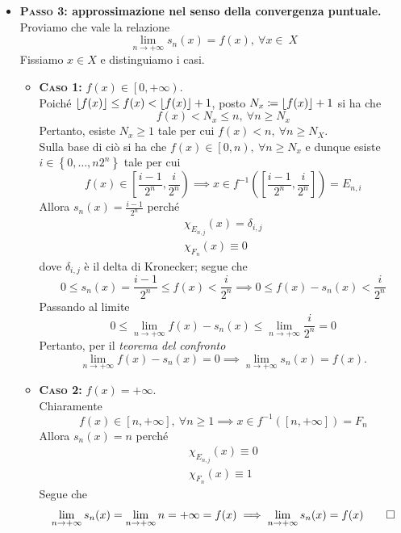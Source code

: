 \begin{demonstration}
\begin{itemize}
\item  \textbf{\textsc{Passo 3}: approssimazione nel senso della convergenza puntuale.}\\
	Proviamo che vale la relazione
	\begin{equation*}
		\lim_{n\to+\infty}s_n(x)=f(x),\ \forall x\in\ X
	\end{equation*}
Fissiamo $x\in X$ e distinguiamo i casi.
\begin{itemize}
	\item \textbf{\textsc{Caso 1:}} $f(x)\in\left[0,+\infty\right)$.\\
	Poiché $\lfloor f(x)\rfloor\leq f(x)<\lfloor f(x)\rfloor+1$, posto $N_x\coloneqq \lfloor f(x)\rfloor+1$ si ha che
	\begin{equation*}
		f(x)< N_x\leq n,\ \forall n\geq N_x
	\end{equation*}
Pertanto, esiste $N_x\geq 1$ tale per cui $f(x)<n,\ \forall n\geq N_X$.\\
Sulla base di ciò si ha che $f(x)\in\left[0,n\right),\ \forall n\geq N_x$ e dunque esiste $i\in\left\{0,\ldots,n2^n\right\}$ tale per cui
\begin{equation*}
	f(x)\in\left[\frac{i-1}{2^n},\frac{i}{2^n}\right)\implies x\in f^{-1}\left(\left[\frac{i-1}{2^n},\frac{i}{2^n}\right]\right)=E_{n,i}
\end{equation*}
Allora $s_n(x)=\frac{i-1}{2^n}$ perché
\begin{gather*}
	\chi_{E_{n,j}}(x)=\delta_{i,j}\\
	\chi_{F_n}(x)\equiv 0
\end{gather*}
dove $\delta_{i,j}$ è il delta di Kronecker; segue che
\begin{equation*}
	0\leq s_n(x)=\frac{i-1}{2^n}\leq f(x)< \frac{i}{2^n}\implies 0\leq f(x)-s_n(x)<\frac{i}{2^n}
\end{equation*}
Passando al limite
\begin{equation*}
	0\leq \lim_{n\to+\infty}f(x)-s_n(x)\leq \lim_{n\to+\infty}\frac{i}{2^n}=0
\end{equation*}
Pertanto, per il \textit{teorema del confronto}
\begin{equation*}
	\lim_{n\to+\infty}f(x)-s_n(x)=0\implies \lim_{n\to+\infty}s_n(x)=f(x).
\end{equation*}
\item \textbf{\textsc{Caso 2:}} $f(x)=+\infty$.\\
Chiaramente
\begin{equation*}
	f(x)\in\left[n,+\infty\right],\ \forall n\geq 1\implies x\in f^{-1}\left(\left[n,+\infty\right]\right)=F_n
\end{equation*}
Allora $s_n(x)=n$ perché
\begin{gather*}
	\chi_{E_{n,j}}(x)\equiv 0\\
	\chi_{F_n}(x)\equiv 1
\end{gather*}
Segue che
\begin{equation*}
	\lim_{n\to+\infty}s_n(x)=\lim_{n\to+\infty}n=+\infty=f(x)\implies \lim_{n\to+\infty}s_n(x)=f(x)\qedhere
\end{equation*}
\end{itemize}
\end{itemize}
\end{demonstration}

